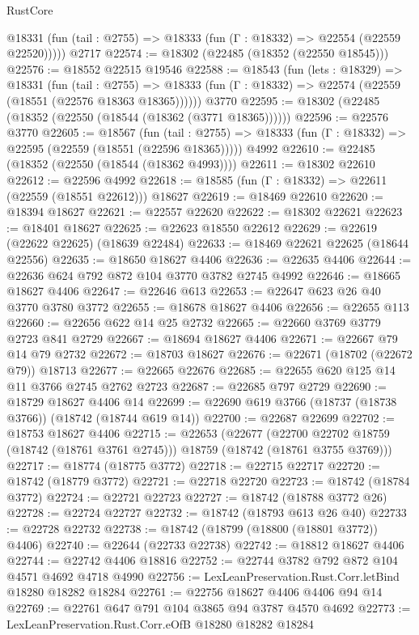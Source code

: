 \begin{lexlean}{RustCore}
\begin{coremodule}
      @18331 (fun (tail : @2755) => @18333 (fun (Γ : @18332) => @22554 (@22559 @22520)))))
    @2717
@22574 := @18302 (@22485 (@18352 (@22550 @18545)))
@22576 := @18552 @22515 @19546
@22588 := @18543
    (fun (lets : @18329) =>
    @18331
      (fun (tail : @2755) =>
      @18333 (fun (Γ : @18332) => @22574 (@22559 (@18551 (@22576 @18363 @18365))))))
    @3770
@22595 := @18302 (@22485 (@18352 (@22550 (@18544 (@18362 (@3771 @18365))))))
@22596 := @22576 @3770
@22605 := @18567
    (fun (tail : @2755) => @18333 (fun (Γ : @18332) => @22595 (@22559 (@18551 (@22596 @18365)))))
    @4992
@22610 := @22485 (@18352 (@22550 (@18544 (@18362 @4993))))
@22611 := @18302 @22610
@22612 := @22596 @4992
@22618 := @18585 (fun (Γ : @18332) => @22611 (@22559 (@18551 @22612))) @18627
@22619 := @18469 @22610
@22620 := @18394 @18627
@22621 := @22557 @22620
@22622 := @18302 @22621
@22623 := @18401 @18627
@22625 := @22623 @18550 @22612
@22629 := @22619 (@22622 @22625) (@18639 @22484)
@22633 := @18469 @22621 @22625 (@18644 @22556)
@22635 := @18650 @18627 @4406
@22636 := @22635 @4406
@22644 := @22636 @624 @792 @872 @104 @3770 @3782 @2745 @4992
@22646 := @18665 @18627 @4406
@22647 := @22646 @613
@22653 := @22647 @623 @26 @40 @3770 @3780 @3772
@22655 := @18678 @18627 @4406
@22656 := @22655 @113
@22660 := @22656 @622 @14 @25 @2732
@22665 := @22660 @3769 @3779 @2723 @841 @2729
@22667 := @18694 @18627 @4406
@22671 := @22667 @79 @14 @79 @2732
@22672 := @18703 @18627
@22676 := @22671 (@18702 (@22672 @79)) @18713
@22677 := @22665 @22676
@22685 := @22655 @620 @125 @14 @11 @3766 @2745 @2762 @2723
@22687 := @22685 @797 @2729
@22690 := @18729 @18627 @4406 @14
@22699 := @22690 @619 @3766 (@18737 (@18738 @3766)) (@18742 (@18744 @619 @14))
@22700 := @22687 @22699
@22702 := @18753 @18627 @4406
@22715 := @22653
    (@22677
      (@22700 @22702 @18759 (@18742 (@18761 @3761 @2745)))
      @18759
      (@18742 (@18761 @3755 @3769)))
@22717 := @18774 (@18775 @3772)
@22718 := @22715 @22717
@22720 := @18742 (@18779 @3772)
@22721 := @22718 @22720
@22723 := @18742 (@18784 @3772)
@22724 := @22721 @22723
@22727 := @18742 (@18788 @3772 @26)
@22728 := @22724 @22727
@22732 := @18742 (@18793 @613 @26 @40)
@22733 := @22728 @22732
@22738 := @18742 (@18799 (@18800 (@18801 @3772)) @4406)
@22740 := @22644 (@22733 @22738)
@22742 := @18812 @18627 @4406
@22744 := @22742 @4406 @18816
@22752 := @22744 @3782 @792 @872 @104 @4571 @4692 @4718 @4990
@22756 := LexLeanPreservation.Rust.Corr.letBind @18280 @18282 @18284
@22761 := @22756 @18627 @4406 @4406 @94 @14
@22769 := @22761 @647 @791 @104 @3865 @94 @3787 @4570 @4692
@22773 := LexLeanPreservation.Rust.Corr.eOfB @18280 @18282 @18284

\end{coremodule}
\end{lexlean}
